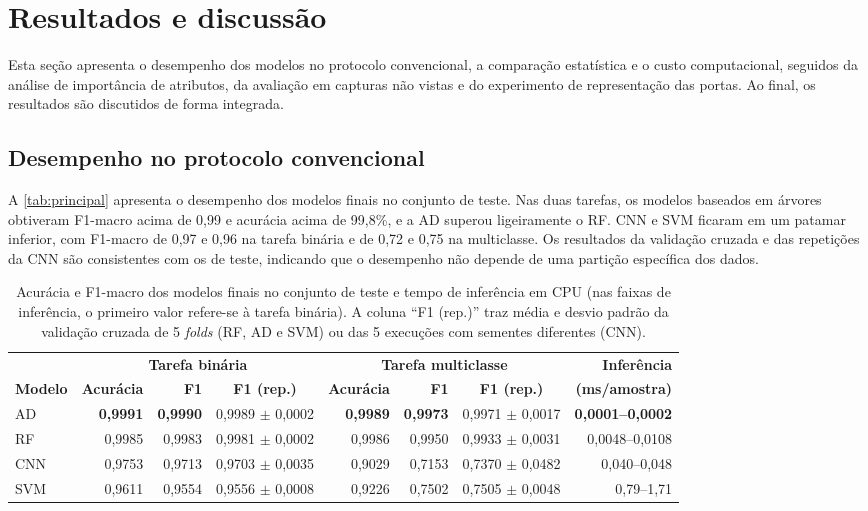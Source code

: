 \documentclass[alpha-refs,brazilian]{CC-EC_TF-TC}
\begin{document}
\section{Resultados e discussão}
\label{sec:resultados}

Esta seção apresenta o desempenho dos modelos no protocolo convencional, a comparação estatística e o custo computacional, seguidos da análise de importância de atributos, da avaliação em capturas não vistas e do experimento de representação das portas. Ao final, os resultados são discutidos de forma integrada.

\subsection{Desempenho no protocolo convencional}
\label{sec:res-convencional}

A \autoref{tab:principal} apresenta o desempenho dos modelos finais no conjunto de teste. Nas duas tarefas, os modelos baseados em árvores obtiveram F1-macro acima de 0,99 e acurácia acima de 99,8\%, e a AD superou ligeiramente o RF. CNN e SVM ficaram em um patamar inferior, com F1-macro de 0,97 e 0,96 na tarefa binária e de 0,72 e 0,75 na multiclasse. Os resultados da validação cruzada e das repetições da CNN são consistentes com os de teste, indicando que o desempenho não depende de uma partição específica dos dados.

\begin{table}[t]
\centering
\caption{Acurácia e F1-macro dos modelos finais no conjunto de teste e tempo de inferência em CPU (nas faixas de inferência, o primeiro valor refere-se à tarefa binária). A coluna ``F1 (rep.)'' traz média e desvio padrão da validação cruzada de 5 \textit{folds} (RF, AD e SVM) ou das 5 execuções com sementes diferentes (CNN).}
\label{tab:principal}
\small
\begin{tabular}{lrrcrrcr}
\toprule
 & \multicolumn{3}{c}{\textbf{Tarefa binária}} & \multicolumn{3}{c}{\textbf{Tarefa multiclasse}} & \textbf{Inferência} \\
\cmidrule(lr){2-4} \cmidrule(lr){5-7}
\textbf{Modelo} & \textbf{Acurácia} & \textbf{F1} & \textbf{F1 (rep.)} & \textbf{Acurácia} & \textbf{F1} & \textbf{F1 (rep.)} & \textbf{(ms/amostra)} \\
\midrule
AD  & \textbf{0,9991} & \textbf{0,9990} & 0,9989 $\pm$ 0,0002 & \textbf{0,9989} & \textbf{0,9973} & 0,9971 $\pm$ 0,0017 & \textbf{0,0001--0,0002} \\
RF  & 0,9985 & 0,9983 & 0,9981 $\pm$ 0,0002 & 0,9986 & 0,9950 & 0,9933 $\pm$ 0,0031 & 0,0048--0,0108 \\
CNN & 0,9753 & 0,9713 & 0,9703 $\pm$ 0,0035 & 0,9029 & 0,7153 & 0,7370 $\pm$ 0,0482 & 0,040--0,048 \\
SVM & 0,9611 & 0,9554 & 0,9556 $\pm$ 0,0008 & 0,9226 & 0,7502 & 0,7505 $\pm$ 0,0048 & 0,79--1,71 \\
\bottomrule
\end{tabular}
\end{table}
\end{document}
